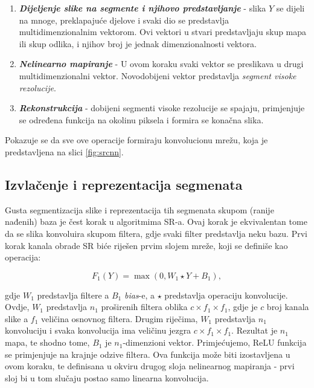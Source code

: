 \documentclass[12pt]{report}
\numberwithin{equation}{section}
\begin{document}
\begin{enumerate}

 \item \textbf{\textit{Dijeljenje slike na segmente i njihovo predstavljanje}} - slika $Y$ se dijeli na mnoge, preklapajuće djelove i svaki dio se predstavlja multidimenzionalnim vektorom. Ovi vektori u stvari predstavljaju skup mapa ili skup odlika, i njihov broj je jednak dimenzionalnosti vektora. 
  
 \item \textbf{\textit{Nelinearno mapiranje}} - U ovom koraku svaki vektor se preslikava u drugi multidimenzionalni vektor. Novodobijeni vektor predstavlja \textit{segment visoke rezolucije}.
  
 \item \textbf{\textit{Rekonstrukcija}} - dobijeni segmenti visoke rezolucije se spajaju, primjenjuje se određena funkcija na okolinu piksela i formira se konačna slika. 

\end{enumerate}
Pokazuje se da sve ove operacije formiraju konvolucionu mrežu, koja je predstavljena na slici \ref{fig:srcnn}.


\subsection{Izvlačenje i reprezentacija segmenata}


Gusta segmentizacija slike i reprezentacija tih segmenata skupom (ranije nađenih) baza je čest korak u algoritmima SR-a. Ovaj korak je ekvivalentan tome da se slika konvoluira skupom filtera, gdje svaki filter predstavlja neku bazu. Prvi korak kanala obrade SR biće riješen prvim slojem mreže, koji se definiše kao operacija:


\begin{equation}
  F_1(Y) = \max(0, W_1 \star Y + B_1),
\end{equation}

gdje $W_1$ predstavlja filtere a $B_1$ \textit{bias}-e, a $\star$ predstavlja operaciju konvolucije. Ovdje, $W_1$ predstavlja $n_1$ proširenih filtera oblika $c \times f_1 \times f_1$, gdje je $c$ broj kanala slike a $f_1$ veličina osnovnog filtera. Drugim riječima, $W_1$ predstavlja $n_1$ konvoluciju i svaka konvolucija ima veličinu jezgra $c \times f_1 \times f_1$. Rezultat je $n_1$ mapa, te shodno tome, $B_1$ je $n_1$-dimenzioni vektor. Primjećujemo, ReLU funkcija se primjenjuje na krajnje odzive filtera.  Ova funkcija može biti izostavljena u ovom koraku, te definisana u okviru drugog sloja nelinearnog mapiranja - prvi sloj bi u tom slučaju postao samo linearna konvolucija.
\end{document}
